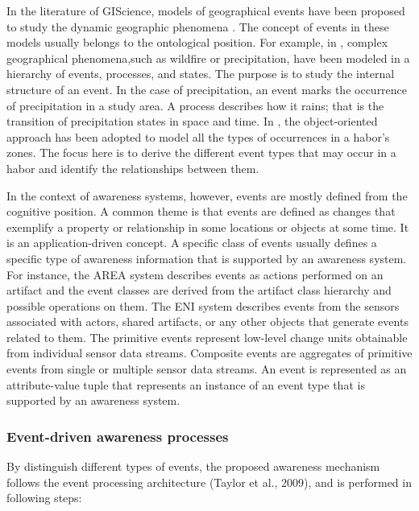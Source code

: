 In the literature of GIScience, models of geographical events have been proposed to study the dynamic geographic phenomena \cite{worboys2005a}. The concept of events in these models usually belongs to the ontological position. For example, in \cite{YuanApril20011523-0406-83}, complex geographical phenomena,such as wildfire or precipitation, have been modeled in a hierarchy of events, processes, and states. The purpose is to study the internal structure of an event. In the case of precipitation, an event marks the occurrence of precipitation in a study area. A process describes how it rains; that is the transition of precipitation states in space and time. In \cite{rodriguez2005a}, the object-oriented approach has been adopted to model all the types of occurrences in a habor's zones. The focus here is to derive the different event types that may occur in a habor and identify the relationships between them.   

In the context of awareness systems, however, events are mostly defined from the cognitive position. A common theme is that events are defined as changes that exemplify a property or relationship in some locations or objects at some time. It is an application-driven concept. A specific class of events usually defines a specific type of awareness information that is supported by an awareness system. For instance, the AREA system \cite{fuchs1999a} describes events as actions performed on an artifact and the event classes are derived from the artifact class hierarchy and possible operations on them. The ENI system \cite{gross2004a} describes events from the sensors associated with actors, shared artifacts, or any other objects that generate events related to them. The primitive events represent low-level change units obtainable from individual sensor data streams. Composite events are aggregates of primitive events from single or multiple sensor data streams. An event is represented as an attribute-value tuple that represents an instance of an event type that is supported by an awareness system.

\subsubsection{Event-driven awareness processes} %
\label{ssub:event_driven_awareness_processes}
By distinguish different types of events, the proposed awareness mechanism follows the event processing architecture (Taylor et al., 2009), and is performed in following steps: 


